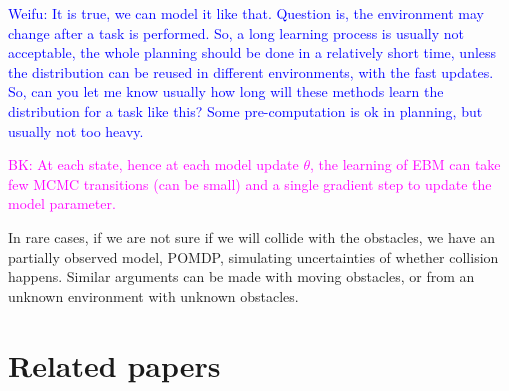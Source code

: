 \documentclass{article}
\begin{document}
\textcolor{blue}{Weifu: It is true, we can model it like that. Question is, the environment may change after a task is performed. So, a long learning process is usually not acceptable, the whole planning should be done in a relatively short time, unless the distribution can be reused in different environments, with the fast updates. So, can you let me know usually how long will these methods learn the distribution for a task like this? Some pre-computation is ok in planning, but usually not too heavy. }

\textcolor{magenta}{BK: At each state, hence at each model update $\theta$, the learning of EBM can take few MCMC transitions (can be small) and a single gradient step to update the model parameter.}

In rare cases, if we are not sure if we will collide with the obstacles, we have an partially observed model, POMDP, simulating uncertainties of whether collision happens. Similar arguments can be made with moving obstacles, or from an unknown environment with unknown obstacles. 

\section{Related papers}
\end{document}
